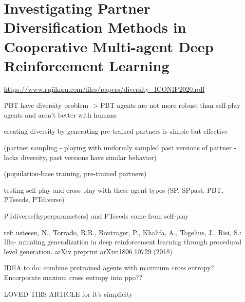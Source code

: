 \documentclass{report}
\begin{document}
\section{Investigating Partner Diversification
Methods in Cooperative Multi-agent
Deep Reinforcement Learning}
\url{https://www.rujikorn.com/files/papers/diversity_ICONIP2020.pdf}
\begin{list}{}{}
    \item PBT have diversity problem -> PBT agents are not more robust than self-play agents and aren't better with humans
    \item creating diversity by generating pre-trained partners is simple but effective
    \item (partner sampling - playing with uniformly sampled past versions of partner - lacks diversity, past versions have similar behavior)
    \item (population-base training, pre-trained partners)
    \item testing self-play and cross-play with these agent types (SP, SPpast, PBT, PTseeds, PTdiverse)
    \item PTdiverse(hyperparameters) and PTseeds come from self-play
    \item ref: ustesen, N., Torrado, R.R., Bontrager, P., Khalifa, A., Togelius, J., Risi, S.: Illu-
    minating generalization in deep reinforcement learning through procedural level
    generation. arXiv preprint arXiv:1806.10729 (2018)
    \item IDEA to do: combine pretrained agents with maximum cross entropy? Encorporate maxium cross entropy into ppo??
    \item LOVED THIS ARTICLE for it's simplicity
    
    
\end{list}
\end{document}
